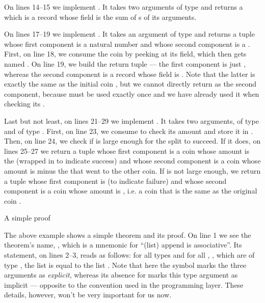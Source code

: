 On lines 14--15 we implement . It takes two arguments of type  and returns a  which is a record whose  field is the sum of s of its arguments.

On lines 17--19 we implement . It takes an argument  of type  and returns a tuple whose first component is a natural number and whose second component is a . First, on line 18, we consume the coin  by peeking at its  field, which then gets named . On line 19, we build the return tuple --- the first component is just , whereas the second component is a record whose  field is . Note that the latter is exactly the same as the initial coin , but we cannot directly return  as the second component, because  must be used exactly once and we have already used it when checking its .

Last but not least, on lines 21--29 we implement . It takes two arguments,  of type  and  of type . First, on line 23, we consume  to check its amount and store it in . Then, on line 24, we check if  is large enough for the split to succeed. If it does, on lines 25--27 we return a tuple whose first component is a coin whose amount is the  (wrapped in  to indicate success) and whose second component is a coin whose amount is  minus the  that went to the other coin. If  is not large enough, we return a tuple whose first component is  (to indicate failure) and whose second component is a coin whose amount is , i.e. a coin that is the same as the original coin .

\begin{example}{A simple proof}



\end{example}

The above example shows a simple theorem and its proof. On line 1 we see the theorem's name, , which is a mnemonic for ``(list) append is associative''. Its statement, on lines 2--3, reads as follows: for all types  and for all , ,  which are of type , the list  is equal to the list . Note that here the symbol  marks the three arguments as \textit{explicit}, whereas its absence for  marks this type argument as implicit --- opposite to the convention used in the programming layer. These details, however, won't be very important for us now.

